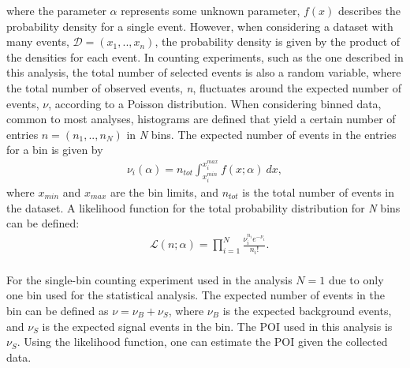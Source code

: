 where the parameter $\alpha$ represents some unknown parameter, $f(x)$ describes the probability density for a single event. However, when considering a dataset with many events, $\mathcal{D} = (x_1,..,x_n)$, the probability density is given by the product of the densities for each event. In counting experiments, such as the one described in this analysis, the total number of selected events is also a random variable, where the total number of observed events, \emph{n}, fluctuates around the expected number of events, $\nu$, according to a Poisson distribution. When considering binned data, common to most analyses, histograms are defined that yield a certain number of entries $n = (n_1,..,n_N)$ in \emph{N} bins. The expected number of events in the entries for a bin is given by
\begin{equation}
\begin{aligned}
    \nu_i(\alpha) = n_{tot}\int_{x_i^{min}}^{x_i^{max}} f(x;\alpha)~dx,
\end{aligned}
\end{equation}
where $x_{min}$ and $x_{max}$ are the bin limits, and $n_{tot}$ is the total number of events in the dataset. A likelihood function for the total probability distribution for \emph{N} bins can be defined:
\begin{equation}
    \label{eq:poissL}
    \begin{aligned}
        & \mathcal{L}(n;\alpha) = \prod_{i=1}^{N}\frac{\nu_{i}^{n_{i}} e^{-\nu_{i}}}{n_{i}!}. \\
    \end{aligned}
\end{equation}

For the single-bin counting experiment used in the analysis $N = 1$ due to only one bin used for the statistical analysis. The expected number of events in the bin can be defined as $\nu = \nu_B +\nu_S$, where $\nu_B$ is the expected background events, and $\nu_S$ is the expected signal events in the bin. The POI used in this analysis is $\nu_S$. Using the likelihood function, one can estimate the POI given the collected data. 

